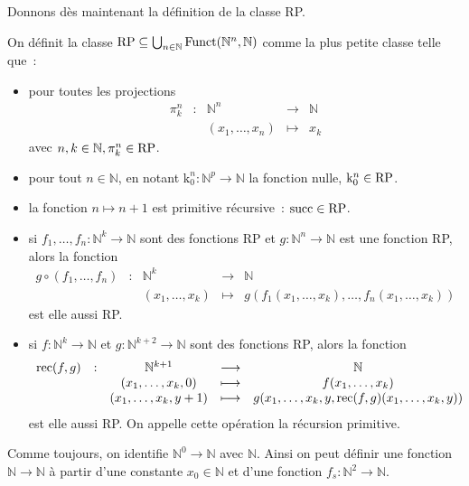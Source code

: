 Donnons dès maintenant la définition de la classe RP.

\begin{definition}
  On définit la classe
  $\operatorname{RP}\subseteq \bigcup_{n \in \mathbb N}\operatorname{Funct}(\mathbb N^n,\mathbb N)$
  comme la plus petite classe telle que~:
  \begin{itemize}
  \item pour toutes les projections
    \[\begin{array}{ccccc}
    \pi_k^n &:& \mathbb N^n &\longrightarrow& \mathbb N\\
    & & (x_1,\ldots,x_n) & \longmapsto & x_k
    \end{array}\]
    avec $n,k\in \mathbb N, \pi_k^n \in \operatorname{RP}$.
  \item pour tout $n \in \mathbb N$, en notant
    $\mathrm k_0^n : \mathbb N^p \to \mathbb N$ la fonction nulle,
    $\mathrm k_0^n \in \operatorname{RP}$.
  \item la fonction $n \mapsto n + 1$ est primitive récursive~: $\operatorname{succ}\in\operatorname{RP}$.
  \item si $f_1,\ldots,f_n : \mathbb N^k \to \mathbb N$ sont des fonctions RP
    et $g : \mathbb N^n \to \mathbb N$ est une fonction RP, alors la fonction
    \[\begin{array}{ccccc}
    g \circ (f_1,\ldots,f_n) & : & \mathbb N^k &\longrightarrow & \mathbb N\\
    & & (x_1,\ldots,x_k) & \longmapsto &
    g(f_1(x_1,\ldots,x_k),\ldots,f_n(x_1,\ldots,x_k))
    \end{array}\]
    est elle aussi RP.
  \item si $f : \mathbb N^k \to \mathbb N$ et
    $g : \mathbb N^{k+2} \to \mathbb N$ sont des fonctions RP, alors la fonction
    \[\begin{array}{ccccc}
    \operatorname{rec}(f,g) & : & \mathbb N^{k+1} &\longrightarrow & \mathbb N \\
    & & (x_1,\ldots,x_k,0) &\longmapsto & f(x_1,\ldots,x_k)\\
    & & (x_1,\ldots,x_k,y+1) & \longmapsto &
    g(x_1,\ldots,x_k,y,\operatorname{rec}(f,g)(x_1,\ldots,x_k,y))
    \end{array}\]
    est elle aussi RP. On appelle cette opération la récursion primitive.
  \end{itemize}
\end{definition}

\begin{remark}
  Comme toujours, on identifie $\mathbb N^0 \to \mathbb N$ avec $\mathbb N$.
  Ainsi on peut définir une fonction $\mathbb N \to \mathbb N$ à partir d'une
  constante $x_0 \in \mathbb N$ et d'une fonction
  $f_s : \mathbb N^2 \to \mathbb N$.
\end{remark}

